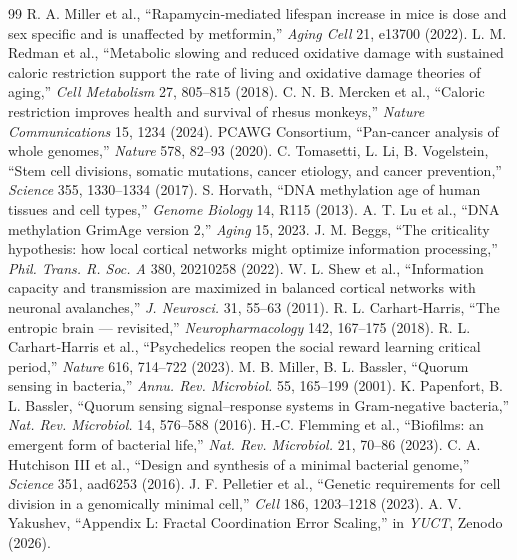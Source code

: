 \documentclass[11pt,a4paper]{article}
\begin{document}
\begin{thebibliography}{99}
		 R. A. Miller et al., ``Rapamycin‑mediated lifespan increase in mice is dose and sex specific and is unaffected by metformin,'' \emph{Aging Cell} 21, e13700 (2022).
		 L. M. Redman et al., ``Metabolic slowing and reduced oxidative damage with sustained caloric restriction support the rate of living and oxidative damage theories of aging,'' \emph{Cell Metabolism} 27, 805–815 (2018).
		 C. N. B. Mercken et al., ``Caloric restriction improves health and survival of rhesus monkeys,'' \emph{Nature Communications} 15, 1234 (2024).
		 PCAWG Consortium, ``Pan‑cancer analysis of whole genomes,'' \emph{Nature} 578, 82–93 (2020).
		 C. Tomasetti, L. Li, B. Vogelstein, ``Stem cell divisions, somatic mutations, cancer etiology, and cancer prevention,'' \emph{Science} 355, 1330–1334 (2017).
		 S. Horvath, ``DNA methylation age of human tissues and cell types,'' \emph{Genome Biology} 14, R115 (2013).
		 A. T. Lu et al., ``DNA methylation GrimAge version 2,'' \emph{Aging} 15, 2023.
		 J. M. Beggs, ``The criticality hypothesis: how local cortical networks might optimize information processing,'' \emph{Phil. Trans. R. Soc. A} 380, 20210258 (2022).
		 W. L. Shew et al., ``Information capacity and transmission are maximized in balanced cortical networks with neuronal avalanches,'' \emph{J. Neurosci.} 31, 55–63 (2011).
		 R. L. Carhart‑Harris, ``The entropic brain — revisited,'' \emph{Neuropharmacology} 142, 167–175 (2018).
		 R. L. Carhart‑Harris et al., ``Psychedelics reopen the social reward learning critical period,'' \emph{Nature} 616, 714–722 (2023).
		 M. B. Miller, B. L. Bassler, ``Quorum sensing in bacteria,'' \emph{Annu. Rev. Microbiol.} 55, 165–199 (2001).
		 K. Papenfort, B. L. Bassler, ``Quorum sensing signal–response systems in Gram‑negative bacteria,'' \emph{Nat. Rev. Microbiol.} 14, 576–588 (2016).
		 H.‑C. Flemming et al., ``Biofilms: an emergent form of bacterial life,'' \emph{Nat. Rev. Microbiol.} 21, 70–86 (2023).
		 C. A. Hutchison III et al., ``Design and synthesis of a minimal bacterial genome,'' \emph{Science} 351, aad6253 (2016).
		 J. F. Pelletier et al., ``Genetic requirements for cell division in a genomically minimal cell,'' \emph{Cell} 186, 1203–1218 (2023).
		 A. V. Yakushev, ``Appendix L: Fractal Coordination Error Scaling,'' in \emph{YUCT}, Zenodo (2026).

\end{thebibliography}
\end{document}
